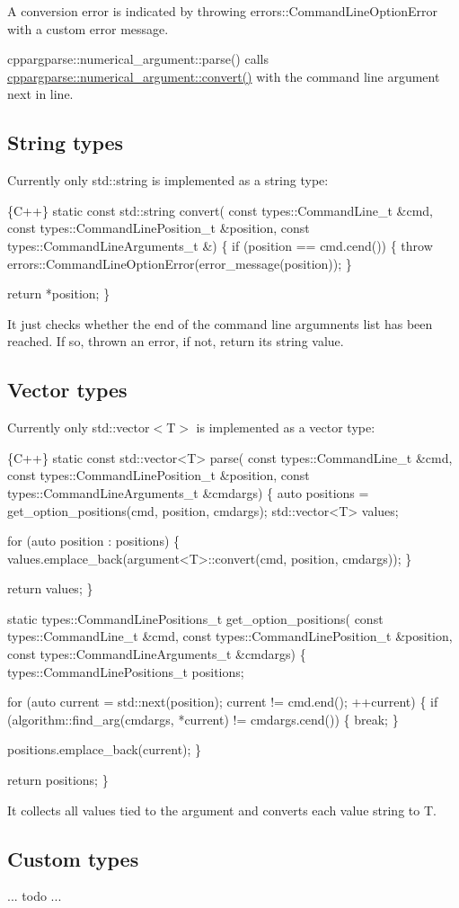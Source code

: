 A conversion error is indicated by throwing {\ttfamily errors\+::\+Command\+Line\+Option\+Error} with a custom error message.

{\ttfamily cppargparse\+::numerical\+\_\+argument\+::parse()} calls {\ttfamily \hyperlink{structcppargparse_1_1numerical__argument_ab775dbbfc851bbd9052b70dfdf0dbb77}{cppargparse\+::numerical\+\_\+argument\+::convert()}} with the command line argument next in line.

\subsection*{String types}

Currently only {\ttfamily std\+::string} is implemented as a string type\+: 
\begin{DoxyCode}
\{C++\}
static const std::string convert(
        const types::CommandLine\_t &cmd,
        const types::CommandLinePosition\_t &position,
        const types::CommandLineArguments\_t &)
\{
    if (position == cmd.cend())
    \{
        throw errors::CommandLineOptionError(error\_message(position));
    \}

    return *position;
\}
\end{DoxyCode}


It just checks whether the end of the command line argumnents list has been reached. If so, thrown an error, if not, return its string value.

\subsection*{Vector types}

Currently only {\ttfamily std\+::vector$<$T$>$} is implemented as a vector type\+: 
\begin{DoxyCode}
\{C++\}
static const std::vector<T> parse(
        const types::CommandLine\_t &cmd,
        const types::CommandLinePosition\_t &position,
        const types::CommandLineArguments\_t &cmdargs)
\{
    auto positions = get\_option\_positions(cmd, position, cmdargs);
    std::vector<T> values;

    for (auto position : positions)
    \{
        values.emplace\_back(argument<T>::convert(cmd, position, cmdargs));
    \}

    return values;
\}


static types::CommandLinePositions\_t get\_option\_positions(
        const types::CommandLine\_t &cmd,
        const types::CommandLinePosition\_t &position,
        const types::CommandLineArguments\_t &cmdargs)
\{
    types::CommandLinePositions\_t positions;

    for (auto current = std::next(position); current != cmd.end(); ++current)
    \{
        if (algorithm::find\_arg(cmdargs, *current) != cmdargs.cend())
        \{
            break;
        \}

        positions.emplace\_back(current);
    \}

    return positions;
\}
\end{DoxyCode}


It collects all values tied to the argument and converts each value string to {\ttfamily T}.

\subsection*{Custom types}

... todo ... 